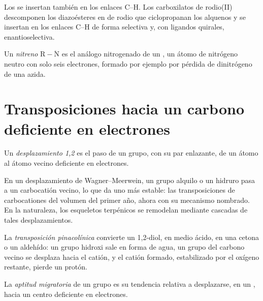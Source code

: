 Los  se insertan también en los enlaces C--H. Los carboxilatos de rodio(II)
descomponen los diazoésteres en  de rodio que ciclopropanan los alquenos y se
insertan en los enlaces C--H de forma selectiva y, con ligandos quirales, enantioselectiva.

\begin{definition}[Nitrenos]\label{def:b3:radicals-carbenes:nitrene}
Un \emph{nitreno} $\mathrm{R{-}\ddot N}$ es el análogo nitrogenado de un , un átomo de
nitrógeno neutro con solo seis electrones, formado por ejemplo por pérdida de
dinitrógeno de una azida.
\end{definition}

\section{Transposiciones hacia un carbono deficiente en electrones}

\begin{definition}[Desplazamiento 1,2]\label{def:b3:radicals-carbenes:shift}
Un \emph{desplazamiento 1,2} es el paso de un grupo, con su par
enlazante, de un átomo al átomo vecino deficiente en electrones.
\end{definition}

En un desplazamiento de Wagner--Meerwein, un grupo alquilo o un hidruro pasa a un carbocatión
vecino, lo que da uno más estable: las transposiciones de carbocationes del
volumen del primer año, ahora con su mecanismo nombrado. En la naturaleza, los esqueletos terpénicos se remodelan
mediante cascadas de tales desplazamientos.

\begin{definition}\label{def:b3:radicals-carbenes:pinacol}
La \emph{transposición pinacolínica} convierte un 1,2-diol,
en medio ácido, en una cetona o un aldehído: un grupo hidroxi sale en forma de agua, un
grupo del carbono vecino se desplaza hacia el catión, y el catión formado,
estabilizado por el oxígeno restante, pierde un protón.
\end{definition}

\begin{definition}\label{def:b3:radicals-carbenes:migratory}
La \emph{aptitud migratoria} de un grupo es su
tendencia relativa a desplazarse, en un , hacia un centro deficiente en electrones.
\end{definition}


